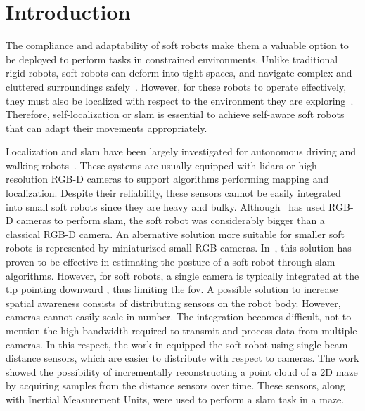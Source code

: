 

\section{Introduction}\label{sec:intro}

\glsresetall

The compliance and adaptability of soft robots make them a valuable option to be deployed to perform tasks in constrained environments. Unlike traditional rigid robots, soft robots can deform into tight spaces, and navigate complex and cluttered surroundings safely~\cite{arezzo2017total, greer2018obstacle,wang2018toward, luong2019eversion, karimi_2023}. 
%
However, for these robots to operate effectively, they must also be localized with respect to the environment they are exploring~\cite{sorensen2021,rosi_2022}.
Therefore, self-localization or \gls{slam} is essential to achieve self-aware soft robots that can adapt their movements appropriately. 
% 

Localization and \gls{slam} have been largely investigated for autonomous driving and walking robots~\cite{gouda_2013,rybczak2024,kazerouni2022,macario2022}. These systems are usually equipped with lidars or high-resolution RGB-D cameras to support algorithms performing mapping and localization.
%
Despite their reliability, these sensors cannot be easily integrated into small soft robots since they are heavy and bulky. Although~\cite{sorensen2021} has used RGB-D cameras to perform \gls{slam}, the soft robot was considerably bigger than a classical RGB-D camera. %
%
An alternative solution more suitable for smaller soft robots is represented by miniaturized small RGB cameras. In~\cite{rosi_2022}, this solution has proven to be effective in estimating the posture of a soft robot through \gls{slam} algorithms. 
%
However, for soft robots, a single camera is typically integrated at the tip pointing downward \cite{rosi_2022, diodato2018soft,albeladi2022hybrid, arezzo2017total, kim2021origami}, thus limiting the \gls{fov}. A possible solution to increase spatial awareness consists of distributing sensors on the robot body. However, cameras cannot easily scale in number. The integration becomes difficult, not to mention the high bandwidth required to transmit and process data from multiple cameras. 
In this respect, the work in \cite{karimi_2023} equipped the soft robot using single-beam distance sensors, which are easier to distribute with respect to cameras. The work showed the possibility of incrementally reconstructing a point cloud of a 2D maze by acquiring samples from the distance sensors over time. These sensors, along with Inertial Measurement Units, were used to perform a \gls{slam} task in a maze. 
% 


